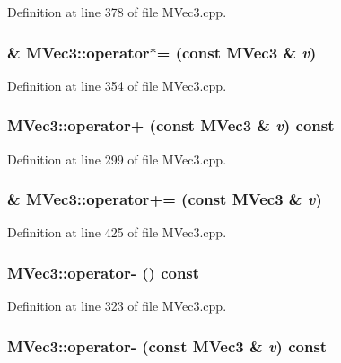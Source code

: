Definition at line 378 of file MVec3.cpp.\hypertarget{class_m_vec3_88ce58e51baa98ce4be1afd487bb2bda}{
\subsubsection[{operator$\ast$=}]{ \& MVec3::operator$\ast$= (const {\bf MVec3} \& {\em v})}}
\label{class_m_vec3_88ce58e51baa98ce4be1afd487bb2bda}




Definition at line 354 of file MVec3.cpp.\hypertarget{class_m_vec3_1c87d4e61056e93c05a97c396b1ad121}{
\subsubsection[{operator+}]{ MVec3::operator+ (const {\bf MVec3} \& {\em v}) const}}
\label{class_m_vec3_1c87d4e61056e93c05a97c396b1ad121}




Definition at line 299 of file MVec3.cpp.\hypertarget{class_m_vec3_d688f01e40c823692a7adc0f57df47a2}{
\subsubsection[{operator+=}]{ \& MVec3::operator+= (const {\bf MVec3} \& {\em v})}}
\label{class_m_vec3_d688f01e40c823692a7adc0f57df47a2}




Definition at line 425 of file MVec3.cpp.\hypertarget{class_m_vec3_e1cbaf41190a9fb28e2d63d310f8db90}{
\subsubsection[{operator-}]{ MVec3::operator- () const}}
\label{class_m_vec3_e1cbaf41190a9fb28e2d63d310f8db90}




Definition at line 323 of file MVec3.cpp.\hypertarget{class_m_vec3_364ae43af58e96a12cb1918dd440b035}{
\subsubsection[{operator-}]{ MVec3::operator- (const {\bf MVec3} \& {\em v}) const}}
\label{class_m_vec3_364ae43af58e96a12cb1918dd440b035}




